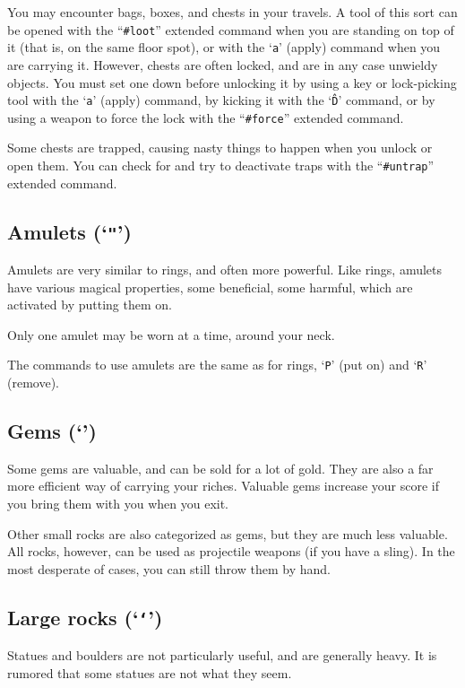 You may encounter bags, boxes, and chests in your travels.  A tool of
this sort can be opened with the ``{\tt \#loot}'' extended command when
you are standing on top of it (that is, on the same floor spot),
or with the `{\tt a}' (apply) command when you are carrying it.  However,
chests are often locked, and are in any case unwieldy objects.
You must set one down before unlocking it by
using a key or lock-picking tool with the `{\tt a}' (apply) command,
by kicking it with the `{\tt \^D}' command,
or by using a weapon to force the lock with the ``{\tt \#force}'' extended command.

Some chests are trapped, causing nasty things to happen when you
unlock or open them.  You can check for and try to deactivate traps
with the ``{\tt \#untrap}'' extended command.
\subsection*{Amulets (`{\tt "}')}

Amulets are very similar to rings, and often more powerful.  Like
rings, amulets have various magical properties, some beneficial,
some harmful, which are activated by putting them on.

Only one amulet may be worn at a time, around your neck.

The commands to use amulets are the same as for rings, `{\tt P}' (put on)
and `{\tt R}' (remove).
\subsection*{Gems (`{\tt *}')}

Some gems are valuable, and can be sold for a lot of gold.  They are also
a far more efficient way of carrying your riches.  Valuable gems increase
your score if you bring them with you when you exit.

Other small rocks are also categorized as gems, but they are much less
valuable.  All rocks, however, can be used as projectile weapons (if you
have a sling).  In the most desperate of cases, you can still throw them
by hand.
\subsection*{Large rocks (`{\tt `}')}

Statues and boulders are not particularly useful, and are generally
heavy.  It is rumored that some statues are not what they seem.

